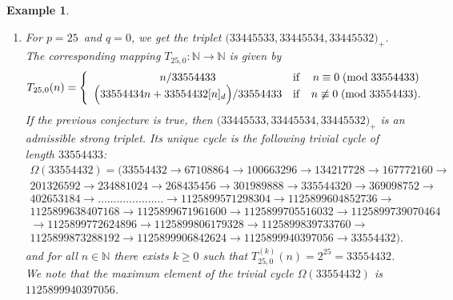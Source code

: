 \documentclass[11pt,a4paper]{article}
\newtheorem{example}{Example}[section]
\newcommand*\modd[3]{#1\equiv#2\;( {\rm mod}\;  #3)}
\newcommand*\notmodd[3]{#1\not\equiv#2\;( {\rm mod}\;  #3)}
\begin{document}
\begin{example}
\begin{enumerate}
		\item 	For $p=25$~and $q=0$, we get   the triplet
		$\bigl(33445533,33445534,33445532\bigr)_+$. The  corresponding 
		mapping  $T_{25,0}:\mathbb{N}\longrightarrow \mathbb{N} $ is given  by
		\begin{equation}\label{mapT_Exp3}
			T_{25,0}(n)=\left\{\begin{array}{ccc}
				n/33554433&\mathrm{if}& \modd{n}{0}{33554433}\\ 
				\Bigl(33554434 n+33554432 [ n]_d\Bigr)/33554433&\mathrm{if}& \notmodd{n}{0}{33554433}.\\
			\end{array}\right.
		\end{equation}
		If the previous conjecture is true,  then  $\bigl(33445533,33445534,33445532\bigr)_+$ is an admissible strong triplet. Its
		unique cycle is the following trivial cycle of length $33554433$: \\
		$
		\begin{array}{ll}
			\Omega(33554432)=
			(33554432 \rightarrow 67108864\rightarrow 100663296\rightarrow 134217728 \rightarrow 167772160
			\rightarrow &\\
			201326592 \rightarrow 
			234881024\rightarrow 
			268435456\rightarrow 
			301989888\rightarrow 
			335544320\rightarrow 
			369098752\rightarrow &\\
			402653184\rightarrow 
			\ldots\ldots\ldots\ldots\ldots\ldots\ldots\rightarrow 
			1125899571298304\rightarrow 
			1125899604852736\rightarrow &\\
			1125899638407168\rightarrow 
			1125899671961600\rightarrow 
			1125899705516032\rightarrow 
			1125899739070464&\\\rightarrow 
			1125899772624896\rightarrow 
			1125899806179328\rightarrow
			1125899839733760\rightarrow&\\
			1125899873288192\rightarrow
			1125899906842624\rightarrow 1125899940397056 \rightarrow 33554432).&
		\end{array}
		$
		and for all $n\in \mathbb{N}$ there exists $k\geq 0$ such that $T_{25,0}^{(k)}(n)= 2^{25}=33554432$. We note that the maximum element of the trivial cycle $\Omega(33554432)$ is $1125899940397056$. 
		
	\end{enumerate}
\end{example}
\end{document}
